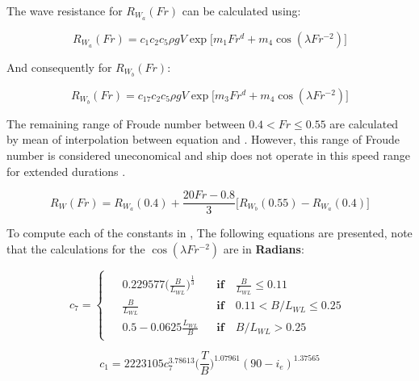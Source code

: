The wave resistance for $R_{W_a}(Fr)$ can be calculated using:

\begin{equation}\label{eqn:R_w_low}
    R_{W_a}(Fr) = c_1 c_2 c_5 \rho g V  \exp \biggl[ m_1 Fr^d + m_4 \cos(\lambda Fr ^{-2}) \biggr]
\end{equation}

And consequently for $R_{W_b}(Fr)$:

\begin{equation}\label{eqn:R_w_high}
    R_{W_b}(Fr) = c_{17} c_2 c_5 \rho g V  \exp \biggl[ m_3 Fr^d + m_4 \cos(\lambda Fr ^{-2}) \biggr]
\end{equation}

The remaining range of Froude number between $0.4 < Fr \leqslant 0.55 $ are calculated by mean of interpolation between equation  and . However, this range of Froude number is considered uneconomical and ship does not operate in this speed range for extended durations .

\begin{equation}\label{eqn_R_w_mid}
    R_W(Fr) = R_{W_a}(0.4) + \frac{20Fr-0.8}{3} \biggl[ R_{W_b}(0.55) - R_{W_a}(0.4)\biggr]
\end{equation}

To compute each of the constants in , The following equations are presented, note that the calculations for the \textbf{$\cos (\lambda Fr^{-2})$} are in \textbf{Radians}:

\begin{equation}\label{eqn:c_17}
    c_7 = \begin{cases}
        \begin{aligned}
        &0.229577\biggl(\frac{B}{L_{WL}} \biggr)^\frac{1}{3}  &&\textbf{if} \quad \frac{B}{L_{WL}} \leqslant 0.11 \\
        &\frac{B}{L_{WL}}  &&\textbf{if}  \quad 0.11 < B/L_{WL} \leqslant 0.25\\
        &0.5 - 0.0625\frac{L_{WL}}{B}  &&\textbf{if}  \quad B/L_{WL}>0.25 
        \end{aligned} 
    \end{cases}
\end{equation}

\begin{equation}\label{eqn:c_1}
    c_1 = 2223105c_7^{3.78613}\biggl( \frac{T}{B}\biggr)^{1.07961}(90-i_e)^{1.37565}
\end{equation}

